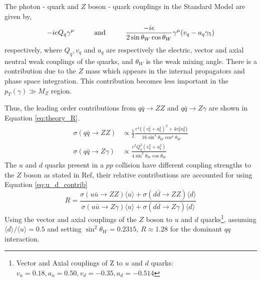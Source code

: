 \documentclass[11pt,a4paper,final]{report}
\begin{document}
The photon - quark and $Z$ boson - quark couplings in the Standard Model are given by,
\begin{equation}
	-ieQ_q\gamma^{\mu} \hspace{1 cm} \text{and} \hspace{1 cm}\frac{-ie}{2 \sin\theta_W \cos\theta_W}\gamma^{\mu}(v_q - a_q\gamma_5)
\end{equation}
respectively, where $Q_q,v_q$ and $a_q$ are respectively the electric, vector and axial neutral weak couplings of the quarks, and $\theta_W$ is the weak mixing angle. There is a contribution due to the $Z$ mass which appears in the internal propagators and phase space integration. This contribution becomes less important in the $p_T(\gamma)\gg M_Z$ region.

Thus, the leading order contributions from $q\bar{q}\rightarrow ZZ$ and $q\bar{q}\rightarrow Z\gamma$ are shown in Equation \ref{eq:theory_R}.
\begin{equation}
\begin{split}
	\sigma(q\bar{q}\rightarrow ZZ) &\propto \frac{1}{2}\frac{e^4\{(v_q^2 + a_q^2)^2 + 4v_q^2a_q^2\} }{16\sin^4\theta_W\cos^4\theta_W}\\[1.5ex]
	\sigma(q\bar{q}\rightarrow Z\gamma) &\propto \frac{e^2Q_q^2(v^2_q + a^2_q)}{4\sin^2\theta_W\cos\theta_W}
\end{split}
\label{eq:theory_R}
\end{equation}
The $u$ and $d$ quarks present in a $pp$ collision have different coupling strengths to the $Z$ boson as stated in Ref\cite{Z_coupling}, their relative contributions are accounted for using Equation \ref{eq:u_d_contrib}
\begin{equation}
R = \frac{\sigma(u\bar{u}\rightarrow ZZ)\langle u\rangle + \sigma(d\bar{d}\rightarrow ZZ)\langle d\rangle}{\sigma(u\bar{u}\rightarrow Z\gamma)\langle u\rangle + \sigma(d\bar{d}\rightarrow Z\gamma)\langle d\rangle}
\label{eq:u_d_contrib}
\end{equation}
Using the vector and axial couplings of the $Z$ boson to $u$ and $d$ quarks\footnote{Vector and Axial couplings of Z to $u$ and $d$ quarks: $v_u = 0.18, a_u = 0.50, v_d = -0.35, a_d = -0.514$}, assuming $\langle d \rangle/\langle u\rangle = 0.5$ and setting $\sin^2\theta_W = 0.2315$, $R\approx 1.28$ for the dominant $qq$ interaction.
\end{document}
